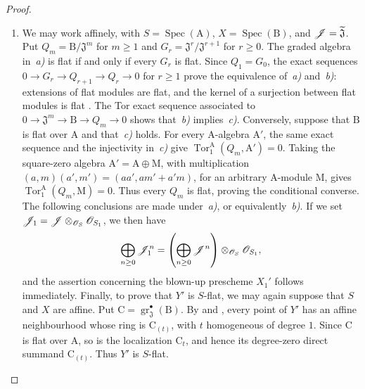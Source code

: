 \begin{proof}
\begin{enumerate}[label=(\roman*)]
  \item We may work affinely, with $S=\operatorname{Spec}(\mathrm{A})$, $X=\operatorname{Spec}(\mathrm{B})$, and $\mathscr{J}=\widetilde{\mathfrak{J}}$. Put $Q_m=\mathrm{B}/\mathfrak{J}^m$ for $m\geq1$ and $G_r=\mathfrak{J}^r/\mathfrak{J}^{r+1}$ for $r\geq0$. The graded algebra in~\emph{a)} is flat if and only if every $G_r$ is flat. Since $Q_1=G_0$, the exact sequences $0\to G_r\to Q_{r+1}\to Q_r\to0$ for $r\geq1$ prove the equivalence of~\emph{a)} and~\emph{b)}: extensions of flat modules are flat, and the kernel of a surjection between flat modules is flat . The Tor exact sequence associated to $0\to\mathfrak{J}^m\to\mathrm{B}\to Q_m\to0$ shows that~\emph{b)} implies~\emph{c)}. Conversely, suppose that $\mathrm{B}$ is flat over $\mathrm{A}$ and that~\emph{c)} holds. For every $\mathrm{A}$-algebra $\mathrm{A}'$, the same exact sequence and the injectivity in~\emph{c)} give $\operatorname{Tor}_1^{\mathrm{A}}(Q_m,\mathrm{A}')=0$. Taking the square-zero algebra $\mathrm{A}'=\mathrm{A}\oplus\mathrm{M}$, with multiplication $(a,m)(a',m')=(aa',am'+a'm)$, for an arbitrary $\mathrm{A}$-module $\mathrm{M}$, gives $\operatorname{Tor}_1^{\mathrm{A}}(Q_m,\mathrm{M})=0$. Thus every $Q_m$ is flat, proving the conditional converse. The following conclusions are made under~\emph{a)}, or equivalently~\emph{b)}.
If we set $\mathscr{J}_1=\mathscr{J}\otimes_{\mathscr{O}_S}\mathscr{O}_{S_1}$, we then have
\[
  \bigoplus_{n\geq0}\mathscr{J}_1^n=\left(\bigoplus_{n\geq0}\mathscr{J}^n\right)\otimes_{\mathscr{O}_S}\mathscr{O}_{S_1},
\]
and the assertion concerning the blown-up prescheme $X_1'$ follows immediately.
Finally, to prove that $Y'$ is $S$-flat, we may again suppose that $S$ and $X$ are affine. Put $\mathrm{C}=\operatorname{gr}_\mathfrak{J}^\bullet(\mathrm{B})$. By  and , every point of $Y'$ has an affine neighbourhood whose ring is $\mathrm{C}_{(t)}$, with $t$ homogeneous of degree $1$. Since $\mathrm{C}$ is flat over $\mathrm{A}$, so is the localization $\mathrm{C}_t$, and hence its degree-zero direct summand $\mathrm{C}_{(t)}$. Thus $Y'$ is $S$-flat.


\end{enumerate}
\end{proof}
